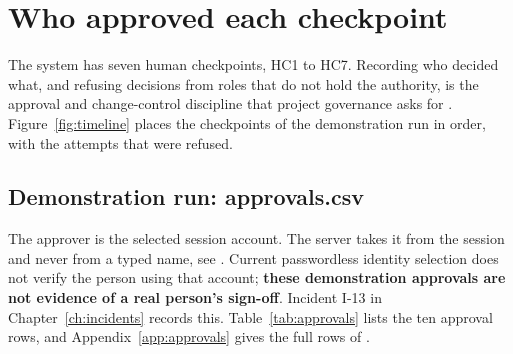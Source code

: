 \chapter{Who approved each checkpoint}
\label{ch:approvals}

The system has seven human checkpoints, HC1 to HC7. Recording who decided what, and refusing decisions from roles that do not hold the authority, is the approval and change-control discipline that project governance asks for \parencite{pmi2021pmbok7}. Figure~\ref{fig:timeline} places the checkpoints of the demonstration run in order, with the attempts that were refused.



\section{Demonstration run: approvals.csv}
\label{sec:demoapprovals}

The approver is the selected session account. The server takes it from the session and never from a typed name, see . Current passwordless identity selection does not verify the person using that account; \textbf{these demonstration approvals are not evidence of a real person's sign-off}. Incident I-13 in Chapter~\ref{ch:incidents} records this. Table~\ref{tab:approvals} lists the ten approval rows, and Appendix~\ref{app:approvals} gives the full rows of .

